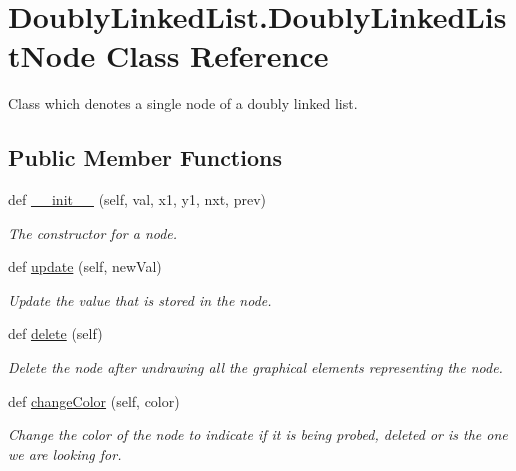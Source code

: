 \hypertarget{class_doubly_linked_list_1_1_doubly_linked_list_node}{}\section{Doubly\+Linked\+List.\+Doubly\+Linked\+List\+Node Class Reference}
\label{class_doubly_linked_list_1_1_doubly_linked_list_node}


Class which denotes a single node of a doubly linked list.  


\subsection*{Public Member Functions}
\begin{DoxyCompactItemize}
\item 
def \hyperlink{class_doubly_linked_list_1_1_doubly_linked_list_node_aefc467f9e00150472256bfef2a7f5b73}{\+\_\+\+\_\+init\+\_\+\+\_\+} (self, val, x1, y1, nxt, prev)
\begin{DoxyCompactList}\small\item\em The constructor for a node. \end{DoxyCompactList}\item 
def \hyperlink{class_doubly_linked_list_1_1_doubly_linked_list_node_a241b11fb616624a362ee9c0dcbc42ad2}{update} (self, new\+Val)
\begin{DoxyCompactList}\small\item\em Update the value that is stored in the node. \end{DoxyCompactList}\item 
def \hyperlink{class_doubly_linked_list_1_1_doubly_linked_list_node_ab30dca7fdc595c9497a64c147ae95a99}{delete} (self)
\begin{DoxyCompactList}\small\item\em Delete the node after undrawing all the graphical elements representing the node. \end{DoxyCompactList}\item 
def \hyperlink{class_doubly_linked_list_1_1_doubly_linked_list_node_af25b62314997d91e410bd4f5d43dacfb}{change\+Color} (self, color)
\begin{DoxyCompactList}\small\item\em Change the color of the node to indicate if it is being probed, deleted or is the one we are looking for. \end{DoxyCompactList}\item 

\end{DoxyCompactItemize}
